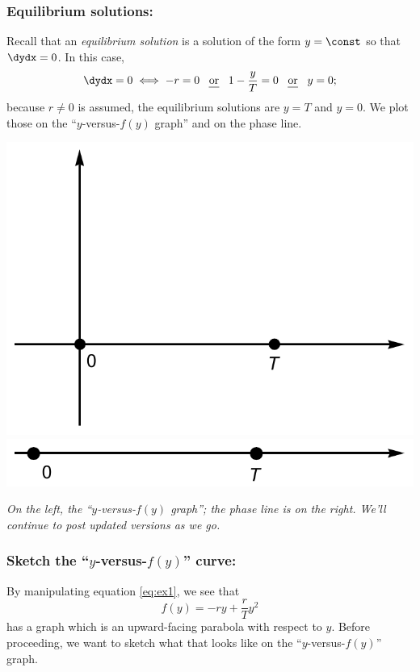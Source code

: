 \documentclass[12pt]{article}
\theoremstyle{definition}
\theoremstyle{underl}
\newcommand{\capt}[1]{\begin{adjustwidth}{0.5in}{0.5in}\centering\small\textit{#1}\end{adjustwidth}}
\begin{document}
	\subsubsection*{Equilibrium solutions:}\par
	Recall that an \textit{equilibrium solution} is a solution of the form $y=\const$ so that $\dydx=0$. In this case,
	\begin{equation}\label{eq:Eq1}\dydx=0\iff-r=0\text{\hspace{3mm}\ul{or}\hspace{3mm}}1-\frac{y}{T}=0\text{\hspace{3mm}\ul{or}\hspace{3mm}}y=0;\end{equation}
	because $r\neq 0$ is assumed, the equilibrium solutions are $y=T$ and $y=0$. We plot those on the ``$y$-versus-$f(y)$ graph'' and on the phase line.
	\begin{center}
		\includegraphics[align=c,scale=0.675]{Ex1_yf(y)_1}
		\hspace{9mm}
		\includegraphics[align=c,scale=0.675]{Ex1_Phase_1}
		\vspace{1.5mm}
		\capt{On the left, the ``$y$-versus-$f(y)$ graph''; the phase line is on the right. We'll continue to post updated versions as we go.}
	\end{center}

	\subsubsection*{Sketch the ``$y$-versus-$f(y)$'' curve:}\par
	By manipulating equation \eqref{eq:ex1}, we see that
	$$f(y)=-ry+\frac{r}{T}y^2$$
	has a graph which is an upward-facing parabola with respect to $y$. Before proceeding, we want to sketch what that looks like on the ``$y$-versus-$f(y)$'' graph.
	
\end{document}
